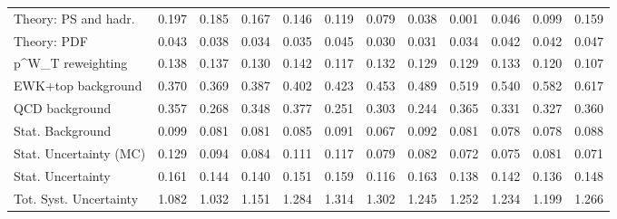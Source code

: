 \begin{tabular}{l|p{0.6cm}p{0.6cm}p{0.6cm}p{0.6cm}p{0.6cm}p{0.6cm}p{0.6cm}p{0.6cm}p{0.6cm}p{0.6cm}p{0.6cm}}
Theory: PS and hadr.                     & 0.197 & 0.185 & 0.167 & 0.146 & 0.119 & 0.079 & 0.038 & 0.001 & 0.046 & 0.099 & 0.159 \\
Theory: PDF                              & 0.043 & 0.038 & 0.034 & 0.035 & 0.045 & 0.030 & 0.031 & 0.034 & 0.042 & 0.042 & 0.047 \\
p^{W}_{T} reweighting                    & 0.138 & 0.137 & 0.130 & 0.142 & 0.117 & 0.132 & 0.129 & 0.129 & 0.133 & 0.120 & 0.107 \\
EWK+top background                       & 0.370 & 0.369 & 0.387 & 0.402 & 0.423 & 0.453 & 0.489 & 0.519 & 0.540 & 0.582 & 0.617 \\
QCD background                           & 0.357 & 0.268 & 0.348 & 0.377 & 0.251 & 0.303 & 0.244 & 0.365 & 0.331 & 0.327 & 0.360 \\
Stat. Background                         & 0.099 & 0.081 & 0.081 & 0.085 & 0.091 & 0.067 & 0.092 & 0.081 & 0.078 & 0.078 & 0.088 \\
Stat. Uncertainty (MC)                   & 0.129 & 0.094 & 0.084 & 0.111 & 0.117 & 0.079 & 0.082 & 0.072 & 0.075 & 0.081 & 0.071 \\
\hline
Stat. Uncertainty                        & 0.161 & 0.144 & 0.140 & 0.151 & 0.159 & 0.116 & 0.163 & 0.138 & 0.142 & 0.136 & 0.148 \\
\hline
Tot. Syst. Uncertainty                   & 1.082 & 1.032 & 1.151 & 1.284 & 1.314 & 1.302 & 1.245 & 1.252 & 1.234 & 1.199 & 1.266 \\
\hline
\end{tabular}
